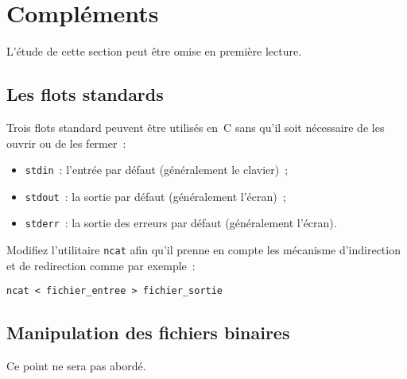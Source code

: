 \section{Compl\'ements}
\label{sec:Complements}
L'\'etude de cette section peut \^etre omise en premi\`ere lecture.
\subsection{Les flots standards}
\label{sec:FlotsStandards}
Trois  flots standard peuvent \^etre utilis\'es   en~C sans qu'il soit
n\'ecessaire de les ouvrir ou de les fermer~:
\begin{itemize}
\item  \texttt{stdin}~:  l'entr\'ee par d\'efaut  (g\'en\'eralement le
  clavier)~;
\item  \texttt{stdout}~:  la  sortie   par d\'efaut  (g\'en\'eralement
  l'\'ecran)~;
\item \texttt{stderr}~:   la    sortie  des   erreurs   par   d\'efaut
  (g\'en\'eralement l'\'ecran).
\end{itemize}
\begin{exercice}
  Modifiez l'utilitaire \texttt{ncat} afin qu'il  prenne en compte les
  m\'ecanisme d'indirection et de redirection comme par exemple~:
\begin{verbatim}
ncat < fichier_entree > fichier_sortie
\end{verbatim}
\end{exercice}
\subsection{Manipulation des fichiers binaires}
\label{sec:FichiersBinaires}
Ce point ne sera pas abord\'e.